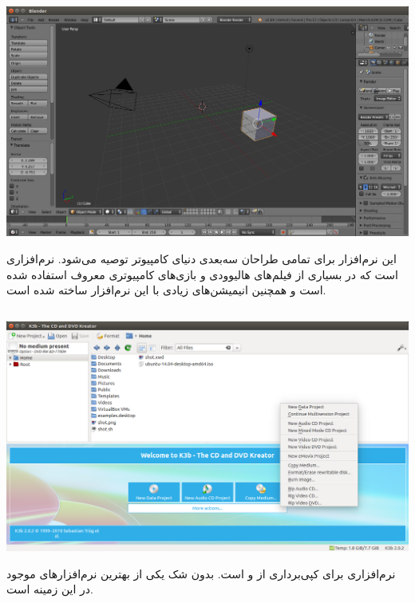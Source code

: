 \subsection[Blender]{}

\begin{center}
\includegraphics[scale=0.3]{pics/43.png}
\end{center}

این نرم‌افزار برای تمامی طراحان سه‌بعدی دنیای کامپیوتر توصیه می‌شود.  نرم‌افزاری است که در بسیاری از فیلم‌های هالیوودی و بازی‌های کامپیوتری معروف استفاده شده است و همچنین انیمیشن‌های زیادی با این نرم‌افزار ساخته شده است.

\subsection[K3b]{}

\begin{center}
\includegraphics[scale=0.3]{pics/44.png}
\end{center}

نرم‌افزاری برای کپی‌برداری از  و  است.  بدون شک یکی از بهترین نرم‌افزارهای موجود در این زمینه است.

